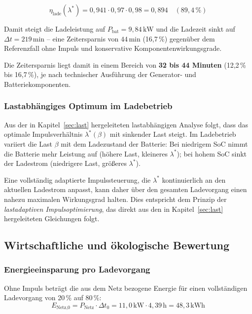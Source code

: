 ﻿\documentclass[a4paper,12pt]{article}
\begin{document}
\begin{equation}
  \eta_\text{lade}(\lambda^*) = 0{,}941 \cdot 0{,}97 \cdot 0{,}98 = 0{,}894 \quad (89{,}4\,\%)
\end{equation}

Damit steigt die Ladeleistung auf $P_\text{bat} = 9{,}84\,\text{kW}$ und
die Ladezeit sinkt auf $\Delta t = 219\,\text{min}$ -- eine Zeitersparnis
von $44\,\text{min}$ (16{,}7\,\%) gegenüber dem Referenzfall ohne Impuls
und konservative Komponentenwirkungsgrade.

Die Zeitersparnis liegt damit in einem Bereich von \textbf{32 bis 44 Minuten}
(12{,}2\,\% bis 16{,}7\,\%), je nach technischer Ausführung der
Generator- und Batteriekomponenten.

\subsubsection{Lastabhängiges Optimum im Ladebetrieb}

Aus der in Kapitel~\ref{sec:last} hergeleiteten lastabhängigen Analyse
folgt, dass das optimale Impulsverhältnis $\lambda^*(\beta)$ mit sinkender
Last steigt. Im Ladebetrieb variiert die Last $\beta$ mit dem Ladezustand
der Batterie: Bei niedrigem SoC nimmt die Batterie mehr Leistung auf
(höhere Last, kleineres $\lambda^*$); bei hohem SoC sinkt der
Ladestrom (niedrigere Last, größeres $\lambda^*$).

Eine vollständig adaptierte Impulssteuerung, die $\lambda^*$ kontinuierlich
an den aktuellen Ladestrom anpasst, kann daher über den gesamten Ladevorgang
einen nahezu maximalen Wirkungsgrad halten. Dies entspricht dem Prinzip
der \textit{lastadaptiven Impulsoptimierung}, das direkt aus den in
Kapitel~\ref{sec:last} hergeleiteten Gleichungen folgt.

\subsection{Wirtschaftliche und ökologische Bewertung}

\subsubsection{Energieeinsparung pro Ladevorgang}

Ohne Impuls beträgt die aus dem Netz bezogene Energie für einen
vollständigen Ladevorgang von 20\,\% auf 80\,\%:
\begin{equation}
  E_\text{Netz,0} = P_\text{Netz} \cdot \Delta t_0
  = 11{,}0\,\text{kW} \cdot 4{,}39\,\text{h} = 48{,}3\,\text{kWh}
\end{equation}
\end{document}
